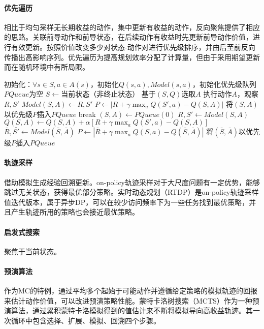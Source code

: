 \documentclass[
12pt, %
a4paper, 
oneside, %
headinclude,footinclude, %
]{scrartcl}
\begin{document}
\paragraph{优先遍历}
相比于均匀采样无长期收益的动作，集中更新有收益的动作，反向聚焦提供了相应的思路。关联前导动作和前导状态，在后续动作有收益时先更新前导动作价值，进行有效更新。按照价值改变多少对状态-动作对进行优先级排序，并由后至前反向传播出高影响序列。优先遍历为提高规划效率分配了计算量，但由于采用期望更新而在随机环境中有所局限。
\begin{myalgorithm}[确定性环境下的优先级遍历]
\State 初始化：$ \forall s \in S, a \in A(s) $，初始化$ Q(s, a), Model(s, a) $，初始化优先级队列$ PQueue $为空
\Loop
\State $ S \gets $当前状态（非终止状态）
\State 基于$ (S, Q) $选取$ A $ 
\State 执行动作$ A $，观察$ R,S' $
\State $ Model(S, A) \gets R,S'$
\State $ P \gets |R + \gamma \max_a Q(S', a) - Q(S, A)| $ 
\State 将$ (S, A) $以优先级$ P $插入$ PQueue $
\EndIf
{} 
\State break
\EndIf
\State $ (S, A) \gets PQueue(0) $ 
\State $ R, S' \gets Model(S, A) $ 
\State $ Q(S, A) \gets Q(S, A) + \alpha[R + \gamma \max_a Q(S', a) - Q(S, A)] $ 
 
\State $ \bar{R},\bar{S'} \gets Model(\bar{S}, \bar{A}) $
\State $ P \gets |\bar{R} + \gamma \max_a Q(S, a) - Q(\bar{S}, \bar{A})| $
\State 将$ (\bar{S}, \bar{A}) $以优先级$ P $插入$ PQueue $
\EndIf
\EndIf
\EndFor
\EndFor
\EndLoop
\end{myalgorithm}
\paragraph{轨迹采样}
借助模拟生成经验回溯更新。on-policy轨迹采样对于大尺度问题有一定优势，能够跳过无关状态，获得最优部分策略。实时动态规划（RTDP）是on-policy轨迹采样值迭代版本，属于异步DP，可以在较少访问频率下为一些任务找到最优策略，并且产生轨迹所用的策略也会接近最优策略。
\paragraph{启发式搜索}
聚焦于当前状态。
\paragraph{预演算法}
作为MC的特例，通过平均多个起始于可能动作并遵循给定策略的模拟轨迹的回报来估计动作价值，可以改进预演策略性能。蒙特卡洛树搜索（MCTS）作为一种预演算法，通过累积蒙特卡洛模拟得到的值估计来不断将模拟导向高收益轨迹。其一次循环中包含选择、扩展、模拟、回溯四个步骤。
\end{document}
